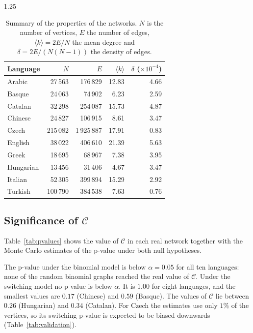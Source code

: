 \documentclass[12pt]{article}
\newcommand{\metric}{\mathcal{C}}
\begin{document}
\begin{spacing}{1.25}
\begin{table}[H]
    \centering
    \begin{tabular}{lrrrr}
        \toprule
        Language & $N$ & $E$ & $\langle k \rangle$ & $\delta$ ($\times 10^{-4}$) \\
        \midrule
        Arabic    & 27\,563 & 176\,829 & 12.83 & 4.66 \\
        Basque    & 24\,063 & 74\,902 & 6.23 & 2.59 \\
        Catalan   & 32\,298 & 254\,087 & 15.73 & 4.87 \\
        Chinese   & 24\,827 & 106\,915 & 8.61 & 3.47 \\
        Czech     & 215\,082 & 1\,925\,887 & 17.91 & 0.83 \\
        English   & 38\,022 & 406\,610 & 21.39 & 5.63 \\
        Greek     & 18\,695 & 68\,967 & 7.38 & 3.95 \\
        Hungarian & 13\,456 & 31\,406 & 4.67 & 3.47 \\
        Italian   & 52\,305 & 399\,894 & 15.29 & 2.92 \\
        Turkish   & 100\,790 & 384\,538 & 7.63 & 0.76 \\
        \bottomrule
    \end{tabular}
    \caption{Summary of the properties of the networks. $N$ is the number of vertices, $E$ the number of edges, $\langle k\rangle = 2E/N$ the mean degree and $\delta = 2E/(N(N-1))$ the density of edges.}
    \label{tab:summary}
\end{table}

\subsection{Significance of $\metric$}
Table~\ref{tab:pvalues} shows the value of $\metric$ in each real network together with the Monte Carlo estimates of the p-value under both null hypotheses.

The p-value under the binomial model is below $\alpha = 0.05$ for all ten languages: none of the random binomial graphs reached the real value of $\metric$. Under the switching model no p-value is below $\alpha$. It is $1.00$ for eight languages, and the smallest values are $0.17$ (Chinese) and $0.59$ (Basque). The values of $\metric$ lie between $0.26$ (Hungarian) and $0.34$ (Catalan). For Czech the estimates use only $1\%$ of the vertices, so its switching p-value is expected to be biased downwards (Table~\ref{tab:validation}).


\end{spacing}
\end{document}
